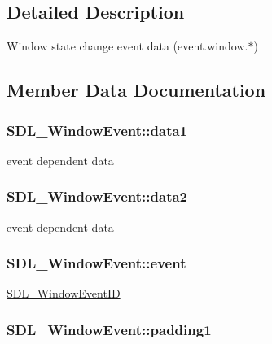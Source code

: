 \subsection{Detailed Description}
Window state change event data (event.\-window.$\ast$) 

\subsection{Member Data Documentation}
\hypertarget{struct_s_d_l___window_event_a01da0025428d3434c80021f3e4089fec}{
\subsubsection[{data1}]{ S\-D\-L\-\_\-\-Window\-Event\-::data1}}\label{struct_s_d_l___window_event_a01da0025428d3434c80021f3e4089fec}
event dependent data \hypertarget{struct_s_d_l___window_event_af6cd0a21bc9ecadfee42f6a0147d7171}{
\subsubsection[{data2}]{ S\-D\-L\-\_\-\-Window\-Event\-::data2}}\label{struct_s_d_l___window_event_af6cd0a21bc9ecadfee42f6a0147d7171}
event dependent data \hypertarget{struct_s_d_l___window_event_a485cd1f07f0f22fdb9f4c4bf214011dc}{
\subsubsection[{event}]{ S\-D\-L\-\_\-\-Window\-Event\-::event}}\label{struct_s_d_l___window_event_a485cd1f07f0f22fdb9f4c4bf214011dc}
\hyperlink{_s_d_l__video_8h_ac486b40a4860d980dbc74d0b4adf3bab}{S\-D\-L\-\_\-\-Window\-Event\-I\-D} \hypertarget{struct_s_d_l___window_event_a09ee59114246eceed4a281033ec6609b}{
\subsubsection[{padding1}]{ S\-D\-L\-\_\-\-Window\-Event\-::padding1}}\label{struct_s_d_l___window_event_a09ee59114246eceed4a281033ec6609b}
